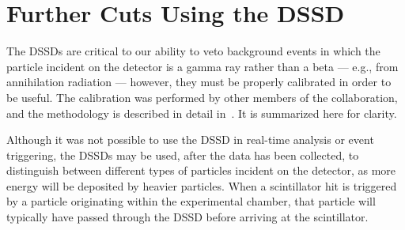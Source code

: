 \section{Further Cuts Using the DSSD}
\label{sec:dssd_cuts}


The DSSDs are critical to our ability to veto background events in which the particle incident on the detector is a gamma ray rather than a beta --- e.g., from annihilation radiation --- however, they must be properly calibrated in order to be useful.  The calibration was performed by other members of the collaboration, and the methodology is described in detail in~\cite{ben_thesis}.  It is summarized here for clarity.

Although it was not possible to use the DSSD in real-time analysis or event triggering, the DSSDs may be used, after the data has been collected, to distinguish between different types of particles incident on the detector, as more energy will be deposited by heavier particles.  When a scintillator hit is triggered by a particle originating within the experimental chamber, that particle will typically have passed through the DSSD before arriving at the scintillator.


